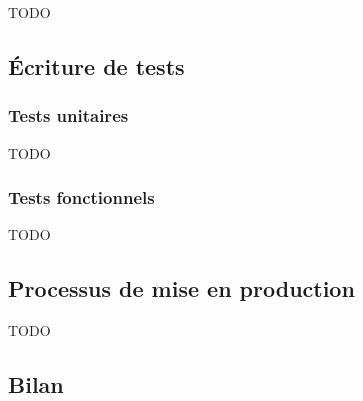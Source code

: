 TODO

\subsection{Écriture de tests}

\subsubsection{Tests unitaires}

TODO

\subsubsection{Tests fonctionnels}

TODO

\subsection{Processus de mise en production}

TODO

\subsection{Bilan}
